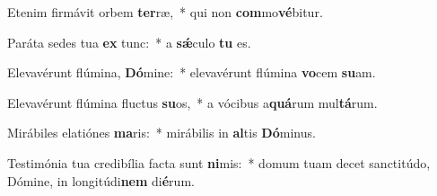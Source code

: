 \item Etenim firmávit orbem \textbf{ter}ræ,~* qui non \textbf{com}mo\textbf{vé}bitur.
\item Paráta sedes tua \textbf{ex} tunc:~* a \textbf{sǽ}culo \textbf{tu} es.
\item Elevavérunt flúmina, \textbf{Dó}mine:~* elevavérunt flúmina \textbf{vo}cem \textbf{su}am.
\item Elevavérunt flúmina fluctus \textbf{su}os,~* a vócibus a\textbf{quá}rum mul\textbf{tá}rum.
\item Mirábiles elatiónes \textbf{ma}ris:~* mirábilis in \textbf{al}tis \textbf{Dó}minus.
\item Testimónia tua credibília facta sunt \textbf{ni}mis:~* domum tuam decet sanctitúdo, Dómine, in longitúdi\textbf{nem} di\textbf{é}rum.
